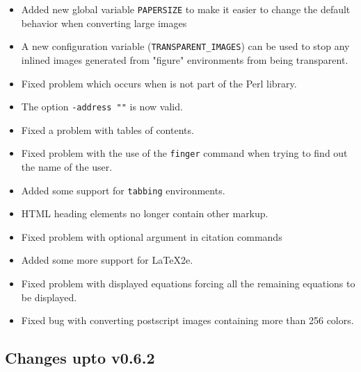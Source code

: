 \begin{htmllist}
\begin{itemize}
\item  Added new global variable \texttt{PAPERSIZE}
to make it easier to change the default behavior when converting large images
\item A new configuration variable (\texttt{TRANSPARENT\_IMAGES}) can be 
used to stop any inlined images generated from "figure" environments
from being transparent.
\item Fixed problem which occurs when  is not part of the
Perl library.
\item The option \texttt{-address ""} is now valid.
\item Fixed a problem with tables of contents.
\item Fixed problem with the use of the \texttt{finger} command when
trying to find out the name of the user.
\item Added some support for \texttt{tabbing} environments.
\item HTML heading elements no longer contain other markup.
\item Fixed problem with optional argument in citation commands
\item Added some more support for LaTeX2e.
\item Fixed problem with displayed equations forcing all the remaining
equations to be displayed.
\item Fixed bug with converting postscript images containing more than
256 colors.
\end{itemize}
\end{htmllist}

\subsection{Changes upto v0.6.2}

